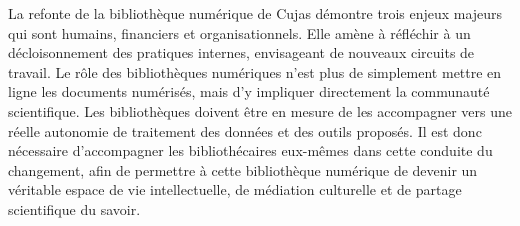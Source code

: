 La refonte de la bibliothèque numérique de Cujas démontre trois enjeux majeurs qui sont humains, financiers et organisationnels. Elle amène à réfléchir à un décloisonnement des pratiques internes, envisageant de nouveaux circuits de travail. Le rôle des bibliothèques numériques n'est plus de simplement mettre en ligne les documents numérisés, mais d'y impliquer directement la communauté scientifique. Les bibliothèques doivent être en mesure de les accompagner vers une réelle autonomie de traitement des données et des outils proposés. Il est donc nécessaire d'accompagner les bibliothécaires eux-mêmes dans cette conduite du changement, afin de permettre à cette bibliothèque numérique de devenir un véritable espace de vie intellectuelle, de médiation culturelle et de partage scientifique du savoir.